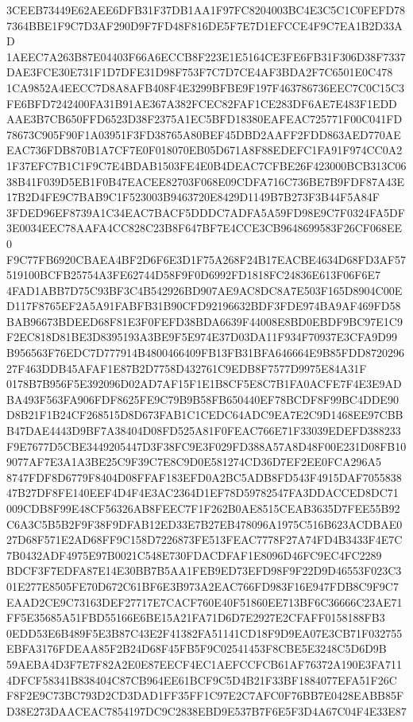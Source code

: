 \documentclass[UTF8,fontset=fandol,zihao=-4,a4paper]{ctexart}
\begin{document}
{{3CEEB73449E62AEE6DFB31F37DB1AA1F97FC8204003BC4E3C5C1C0FEFD787364BBE1F9C7D3AF290D9F7FD48F816DE5F7E7D1EFCCE4F9C7EA1B2D33AD
1AEEC7A263B87E04403F66A6ECCB8F223E1E5164CE3FE6FB31F306D38F7337DAE3FCE30E731F1D7DFE31D98F753F7C7D7CE4AF3BDA2F7C6501E0C478
1CA9852A4EECC7D8A8AFB408F4E3299BFBE9F197F463786736EEC7C0C15C3FE6BFD7242400FA31B91AE367A382FCEC82FAF1CE283DF6AE7E483F1EDD
AAE3B7CB650FFD6523D38F2375A1EC5BFD18380EAFEAC725771F00C041FD78673C905F90F1A03951F3FD38765A80BEF45DBD2AAFF2FDD863AED770AE
EAC736FDB870B1A7CF7E0F018070EB05D671A8F88EDEFC1FA91F974CC0A21F37EFC7B1C1F9C7E4BDAB1503FE4E0B4DEAC7CFBE26F423000BCB313C06
38B41F039D5EB1F0B47EACEE82703F068E09CDFA716C736BE7B9FDF87A43E17B2D4FE9C7BAB9C1F523003B9463720E8429D1149B7B273F3B44F5A84F
3FDED96EF8739A1C34EAC7BACF5DDDC7ADFA5A59FD98E9C7F0324FA5DF3E0034EEC78AAFA4CC828C23B8F647BF7E4CCE3CB9648699583F26CF068EE0
F9C77FB6920CBAEA4BF2D6F6E3D1F75A268F24B17EACBE4634D68FD3AF57519100BCFB25754A3FE62744D58F9F0D6992FD1818FC24836E613F06F6E7
4FAD1ABB7D75C93BF3C4B542926BD907AE9AC8DC8A7E503F165D8904C00ED117F8765EF2A5A91FABFB31B90CFD92196632BDF3FDE974BA9AF469FD58
BAB96673BDEED68F81E3F0FEFD38BDA6639F44008E8BD0EBDF9BC97E1C9F2EC818D81BE3D8395193A3BE9F5E974E37D03DA11F934F70937E3CFA9D99
B956563F76EDC7D777914B4800466409FB13FB31BFA646664E9B85FDD872029627F463DDB45AFAF1E87B2D7758D432761C9EDB8F7577D9975E84A31F
0178B7B956F5E392096D02AD7AF15F1E1B8CF5E8C7B1FA0ACFE7F4E3E9ADBA493F563FA906FDF8625FE9C79B9B58FB650440EF78BCDF8F99BC4DDE90
D8B21F1B24CF268515D8D673FAB1C1CEDC64ADC9EA7E2C9D1468EE97CBBB47DAE4443D9BF7A38404D08FD525A81F0FEAC766E71F33039EDEFD388233
F9E7677D5CBE3449205447D3F38FC9E3F029FD388A57A8D48F00E231D08FB109077AF7E3A1A3BE25C9F39C7E8C9D0E581274CD36D7EF2EE0FCA296A5
8747FDF8D6779F8404D08FFAF183EFD0A2BC5ADB8FD543F4915DAF705583847B27DF8FE140EEF4D4F4E3AC2364D1EF78D59782547FA3DDACCED8DC71
009CDB8F99E48CF56326AB8FEEC7F1F262B0AE8515CEAB3635D7FEE55B92C6A3C5B5B2F9F38F9DFAB12ED33E7B27EB478096A1975C516B623ACDBAE0
27D68F571E2AD68FF9C158D7226873FE513FEAC7778F27A74FD4B3433F4E7C7B0432ADF4975E97B0021C548E730FDACDFAF1E8096D46FC9EC4FC2289
BDCF3F7EDFA87E14E30BB7B5AA1FEB9ED73EFD98F9F22D9D46553F023C301E277E8505FE70D672C61BF6E3B973A2EAC766FD983F16E947FDB8C9F9C7
EAAD2CE9C73163DEF27717E7CACF760E40F51860EE713BF6C36666C23AE71FF5E35685A51FBD55166E6BE15A21FA71D6D7E2927E2CFAFF0158188FB3
0EDD53E6B489F5E3B87C43E2F41382FA51141CD18F9D9EA07E3CB71F032755EBFA3176FDEAA85F2B24D68F45FB5F9C02541453F8CBE5E3248C5D6D9B
59AEBA4D3F7E7F82A2E0E87EECF4EC1AEFCCFCB61AF76372A190E3FA7114DFCF58341B838404C87CB964EE61BCF9C5D4B21F33BF1884077EFA51F26C
F8F2E9C73BC793D2CD3DAD1FF35FF1C97E2C7AFC0F76BB7E0428EABB85FD38E273DAACEAC7854197DC9C2838EBD9E537B7F6E5F3D4A67C04F4E33E87
}}
\end{document}
